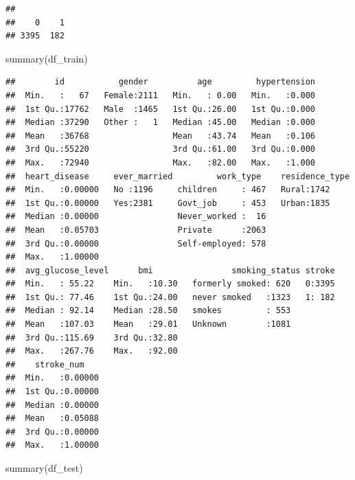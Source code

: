 \documentclass[
]{article}
\newenvironment{Shaded}{\begin{snugshade}}{\end{snugshade}}
\newcommand{\FunctionTok}[1]{\textcolor[rgb]{0.00,0.00,0.00}{#1}}
\newcommand{\NormalTok}[1]{#1}
\renewcommand{\=}[1]{\stackrel{#1}{=}}
\theoremstyle{definition}
\theoremstyle{remark}
\begin{document}
\begin{verbatim}
## 
##    0    1 
## 3395  182
\end{verbatim}

\begin{Shaded}
\begin{Highlighting}[]
\FunctionTok{summary}\NormalTok{(df\_train)}
\end{Highlighting}
\end{Shaded}

\begin{verbatim}
##        id           gender          age         hypertension  
##  Min.   :   67   Female:2111   Min.   : 0.00   Min.   :0.000  
##  1st Qu.:17762   Male  :1465   1st Qu.:26.00   1st Qu.:0.000  
##  Median :37290   Other :   1   Median :45.00   Median :0.000  
##  Mean   :36768                 Mean   :43.74   Mean   :0.106  
##  3rd Qu.:55220                 3rd Qu.:61.00   3rd Qu.:0.000  
##  Max.   :72940                 Max.   :82.00   Max.   :1.000  
##  heart_disease     ever_married         work_type    residence_type
##  Min.   :0.00000   No :1196     children     : 467   Rural:1742    
##  1st Qu.:0.00000   Yes:2381     Govt_job     : 453   Urban:1835    
##  Median :0.00000                Never_worked :  16                 
##  Mean   :0.05703                Private      :2063                 
##  3rd Qu.:0.00000                Self-employed: 578                 
##  Max.   :1.00000                                                   
##  avg_glucose_level      bmi                smoking_status stroke  
##  Min.   : 55.22    Min.   :10.30   formerly smoked: 620   0:3395  
##  1st Qu.: 77.46    1st Qu.:24.00   never smoked   :1323   1: 182  
##  Median : 92.14    Median :28.50   smokes         : 553           
##  Mean   :107.03    Mean   :29.01   Unknown        :1081           
##  3rd Qu.:115.69    3rd Qu.:32.80                                  
##  Max.   :267.76    Max.   :92.00                                  
##    stroke_num     
##  Min.   :0.00000  
##  1st Qu.:0.00000  
##  Median :0.00000  
##  Mean   :0.05088  
##  3rd Qu.:0.00000  
##  Max.   :1.00000
\end{verbatim}

\begin{Shaded}
\begin{Highlighting}[]
\FunctionTok{summary}\NormalTok{(df\_test)}
\end{Highlighting}
\end{Shaded}
\end{document}
